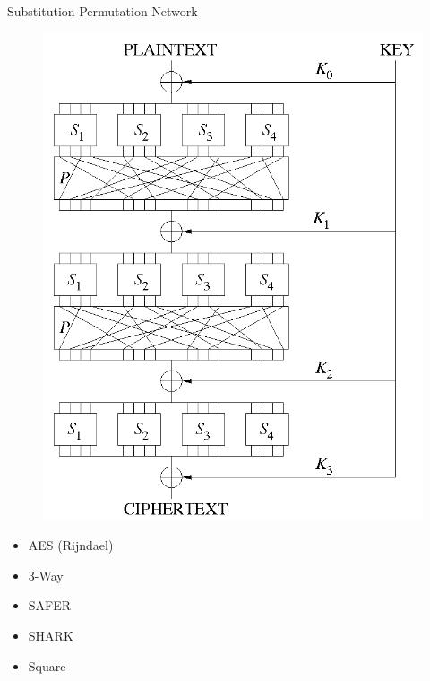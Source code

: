 \documentclass[12pt]{beamer}
\begin{document}
\begin{frame}{Substitution-Permutation Network}
	\centering
	\begin{minipage}{0.45\textwidth}
		\begin{figure}[h!]
			\centering
			\includegraphics[width=\textwidth,height=0.8\textheight,keepaspectratio]{spn}
		\end{figure}
	\end{minipage}
	\begin{minipage}{0.45\textwidth}
		\begin{itemize}
			\item AES (Rijndael)
			\item 3-Way
			\item SAFER
			\item SHARK
			\item Square
		\end{itemize}
	\end{minipage}
\end{frame}
\end{document}

